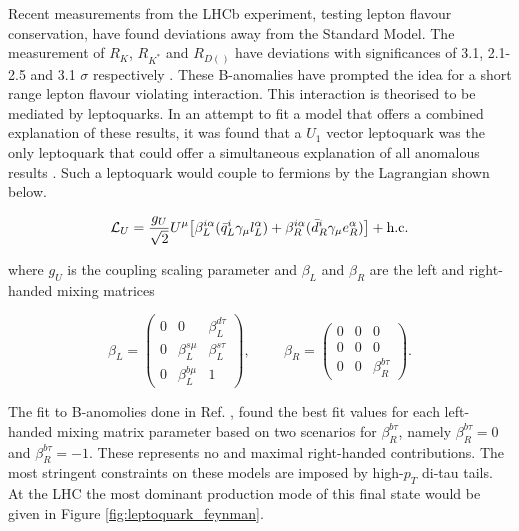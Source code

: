 Recent measurements from the LHCb experiment, testing lepton flavour conservation, have found deviations away from the Standard Model. The measurement of $R_{K}$, $R_{K^{*}}$ and $R_{D(^{})}$ have deviations with significances of 3.1, 2.1-2.5 and 3.1 $\sigma$ respectively \cite{Rk,Rkstar,Rd}. These B-anomalies have prompted the idea for a short range lepton flavour violating interaction. This interaction is theorised to be mediated by leptoquarks. In an attempt to fit a model that offers a combined explanation of these results, it was found that a $U_{1}$ vector leptoquark was the only leptoquark that could offer a simultaneous explanation of all anomalous results \cite{leptoquark}. Such a leptoquark would couple to fermions by the Lagrangian shown below.

\begin{equation}
\mathcal{L}_{U} = \frac{g_{U}}{\sqrt{2}} U^{\mu} \big[ \beta_{L}^{i\alpha}( \bar{q}_{L}^{i} \gamma_{\mu} l_{L}^{\alpha}) + \beta_{R}^{i\alpha}( \bar{d}_{R}^{i} \gamma_{\mu} e_{R}^{\alpha}) \big] + \text{h.c.}
\end{equation}

where $g_{U}$ is the coupling scaling parameter and $\beta_{L}$ and $\beta_{R}$ are the left and right-handed mixing matrices

\begin{equation}
\beta_{L} = 
\begin{pmatrix}
0 & 0 & \beta_{L}^{d\tau} \\
0 & \beta_{L}^{s\mu} & \beta_{L}^{s\tau} \\
0 & \beta_{L}^{b\mu} & 1
\end{pmatrix},
\hspace{1cm}
\beta_{R} = 
\begin{pmatrix}
0 & 0 & 0 \\
0 & 0 & 0 \\
0 & 0 & \beta_{R}^{b\tau}
\end{pmatrix}.
\end{equation}

The fit to B-anomolies done in Ref. \cite{leptoquark}, found the best fit values for each left-handed mixing matrix parameter based on two scenarios for $\beta^{b\tau}_{R}$, namely $\beta^{b\tau}_{R} = 0$ and $\beta^{b\tau}_{R} = -1$. These represents no and maximal right-handed contributions. The most stringent constraints on these models are imposed by high-$p_{T}$ di-tau tails. At the LHC the most dominant production mode of this final state would be given in Figure \ref{fig:leptoquark_feynman}.


